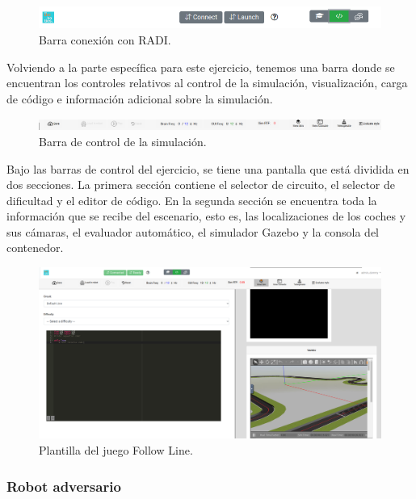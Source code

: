 \documentclass[a4paper, 12pt]{book}
\begin{document}
\begin{figure}[H]
	\centering
    \includegraphics[width=15cm]{img/barra_radi.png}
    \caption{Barra conexión con RADI.}
    \label{figura:conexion_radi}
\end{figure}

Volviendo a la parte específica para este ejercicio, tenemos una barra donde se encuentran los controles relativos al control de la simulación, visualización, carga de código e información adicional sobre la simulación.

\begin{figure}[H]
	\centering
    \includegraphics[width=15cm]{img/barra_control.png}
    \caption{Barra de control de la simulación.}
    \label{figura:conexion_radi}
\end{figure}

Bajo las barras de control del ejercicio, se tiene una pantalla que está dividida en dos secciones. La primera sección contiene el selector de circuito, el selector de dificultad y el editor de código. En la segunda sección se encuentra toda la información que se recibe del escenario, esto es, las localizaciones de los coches y sus cámaras, el evaluador automático, el simulador Gazebo y la consola del contenedor.


\begin{figure}[H]
	\centering
    \includegraphics[width=15cm]{img/follow_line_game.png}
    \caption{Plantilla del juego Follow Line.}
    \label{figura:conexion_radi}
\end{figure}

\subsubsection{Robot adversario}
\label{follow_line_game_adversario}
\end{document}
